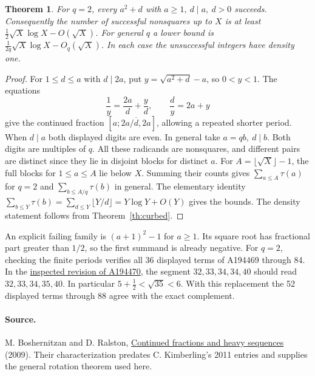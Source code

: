 \documentclass[11pt,letterpaper]{article}
\newtheorem{theorem}{Theorem}
\begin{document}
\begin{theorem}\label{th:count}
For \(q=2\), every \(a^2+d\) with \(a\ge1,\ d\mid a,\ d>0\) succeeds. Consequently the number of successful nonsquares up to \(X\) is at least \(\tfrac12\sqrt X\log X-O(\sqrt X)\). For general \(q\) a lower bound is \(\tfrac{1}{2q}\sqrt X\log X-O_q(\sqrt X)\). In each case the unsuccessful integers have density one.
\end{theorem}
\begin{proof}
For \(1\le d\le a\) with \(d\mid 2a\), put \(y=\sqrt{a^2+d}-a\), so \(0<y<1\). The equations
\[
 \frac1y=\frac{2a}{d}+\frac yd,\qquad \frac d y=2a+y
\]
give the continued fraction \([a;\overline{2a/d,2a}]\), allowing a repeated shorter period. When \(d\mid a\) both displayed digits are even. In general take \(a=qb,\ d\mid b\). Both digits are multiples of \(q\). All these radicands are nonsquares, and different pairs are distinct since they lie in disjoint blocks for distinct \(a\). For \(A=\lfloor\sqrt X\rfloor-1\), the full blocks for \(1\le a\le A\) lie below \(X\). Summing their counts gives \(\sum_{a\le A}\tau(a)\) for \(q=2\) and \(\sum_{b\le A/q}\tau(b)\) in general. The elementary identity \(\sum_{b\le Y}\tau(b)=\sum_{d\le Y}\lfloor Y/d\rfloor=Y\log Y+O(Y)\) gives the bounds. The density statement follows from Theorem~\ref{th:curbed}.
\end{proof}

An explicit failing family is \((a+1)^2-1\) for \(a\ge1\). Its square root has fractional part greater than \(1/2\), so the first summand is already negative. For \(q=2\), checking the finite periods verifies all 36 displayed terms of A194469 through 84. In the \href{https://github.com/oeis/oeisdata/blob/976b0c73e00453b1c1e6f16d83108cb9bb744c3b/seq/A194/A194470.seq}{inspected revision of A194470}, the segment \(32,33,34,34,40\) should read \(32,33,34,35,40\). In particular \(5+\tfrac12<\sqrt{35}<6\). With this replacement the 52 displayed terms through 88 agree with the exact complement.

\paragraph{Source.}
M. Boshernitzan and D. Ralston, \href{https://arxiv.org/abs/0911.2054}{Continued fractions and heavy sequences} (2009). Their characterization predates C. Kimberling's 2011 entries and supplies the general rotation theorem used here.
\end{document}
